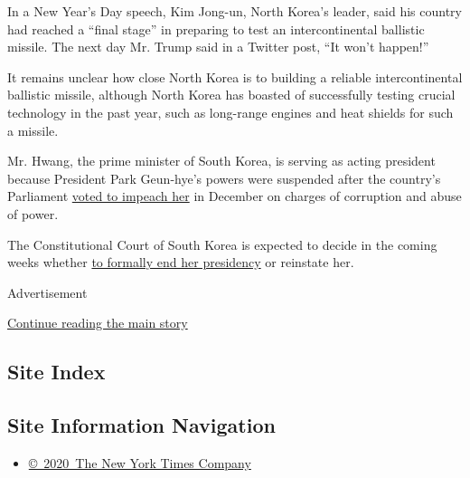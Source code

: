 In a New Year's Day speech, Kim Jong-un, North Korea's leader, said his
country had reached a ``final stage'' in preparing to test an
intercontinental ballistic missile. The next day Mr. Trump said in a
Twitter post, ``It won't happen!''

It remains unclear how close North Korea is to building a reliable
intercontinental ballistic missile, although North Korea has boasted of
successfully testing crucial technology in the past year, such as
long-range engines and heat shields for such a missile.

Mr. Hwang, the prime minister of South Korea, is serving as acting
president because President Park Geun-hye's powers were suspended after
the country's Parliament
\href{https://www.nytimes3xbfgragh.onion/2016/12/09/world/asia/south-korea-president-park-geun-hye-impeached.html}{voted
to impeach her} in December on charges of corruption and abuse of power.

The Constitutional Court of South Korea is expected to decide in the
coming weeks whether
\href{https://www.nytimes3xbfgragh.onion/2016/12/22/world/asia/south-korea-president-park-impeachment.html}{to
formally end her presidency} or reinstate her.

Advertisement

\protect\hyperlink{after-bottom}{Continue reading the main story}

\hypertarget{site-index}{%
\subsection{Site Index}\label{site-index}}

\hypertarget{site-information-navigation}{%
\subsection{Site Information
Navigation}\label{site-information-navigation}}

\begin{itemize}
\tightlist
\item
  \href{https://help.nytimes3xbfgragh.onion/hc/en-us/articles/115014792127-Copyright-notice}{©~2020~The
  New York Times Company}
\end{itemize}

